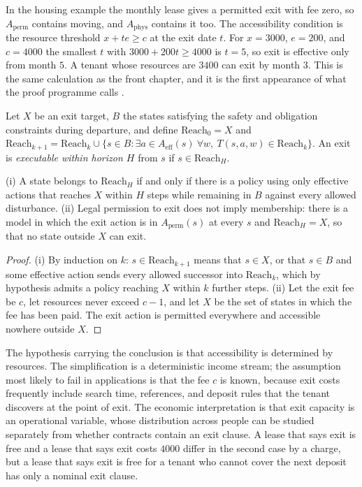 In the housing example the monthly lease gives a permitted exit with fee zero, so $A_{\mathrm{perm}}$ contains moving, and $A_{\mathrm{phys}}$ contains it too. The accessibility condition is the resource threshold $x+te\ge c$ at the exit date $t$. For $x=3000$, $e=200$, and $c=4000$ the smallest $t$ with $3000+200t\ge 4000$ is $t=5$, so exit is effective only from month $5$. A tenant whose resources are $3400$ can exit by month $3$. This is the same calculation as the front chapter, and it is the first appearance of what the proof programme calls .

\begin{definition}\label{def:exec-exit}
Let $X$ be an exit target, $B$ the states satisfying the safety and obligation constraints during departure, and define $\mathrm{Reach}_0=X$ and $\mathrm{Reach}_{k+1}=\mathrm{Reach}_k\cup\{s\in B:\exists a\in A_{\mathrm{eff}}(s)\ \forall w,\ T(s,a,w)\in\mathrm{Reach}_k\}$. An exit is \emph{executable within horizon $H$} from $s$ if $s\in\mathrm{Reach}_H$.
\end{definition}

\begin{theorem}\label{thm:P08}
(i) A state belongs to $\mathrm{Reach}_H$ if and only if there is a policy using only effective actions that reaches $X$ within $H$ steps while remaining in $B$ against every allowed disturbance. (ii) Legal permission to exit does not imply membership: there is a model in which the exit action is in $A_{\mathrm{perm}}(s)$ at every $s$ and $\mathrm{Reach}_H=X$, so that no state outside $X$ can exit.
\end{theorem}

\begin{proof}
(i) By induction on $k$: $s\in\mathrm{Reach}_{k+1}$ means that $s\in X$, or that $s\in B$ and some effective action sends every allowed successor into $\mathrm{Reach}_k$, which by hypothesis admits a policy reaching $X$ within $k$ further steps. (ii) Let the exit fee be $c$, let resources never exceed $c-1$, and let $X$ be the set of states in which the fee has been paid. The exit action is permitted everywhere and accessible nowhere outside $X$.
\end{proof}

The hypothesis carrying the conclusion is that accessibility is determined by resources. The simplification is a deterministic income stream; the assumption most likely to fail in applications is that the fee $c$ is known, because exit costs frequently include search time, references, and deposit rules that the tenant discovers at the point of exit. The economic interpretation is that exit capacity is an operational variable, whose distribution across people can be studied separately from whether contracts contain an exit clause. A lease that says exit is free and a lease that says exit costs $4000$ differ in the second case by a charge, but a lease that says exit is free for a tenant who cannot cover the next deposit has only a nominal exit clause.

